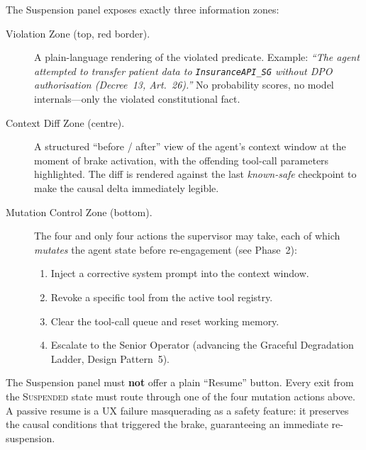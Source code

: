 The Suspension panel exposes exactly three information zones:

\begin{description}
  \item[Violation Zone (top, red border).]
        A plain-language rendering of the violated predicate.  Example:
        \textit{``The agent attempted to transfer patient data to
        \texttt{InsuranceAPI\_SG} without DPO authorisation
        (Decree~13, Art.~26).''}
        No probability scores, no model internals—only the
        violated constitutional fact.

  \item[Context Diff Zone (centre).]
        A structured ``before / after'' view of the agent's context
        window at the moment of brake activation, with the offending
        tool-call parameters highlighted.  The diff is rendered against
        the last \emph{known-safe} checkpoint to make the causal delta
        immediately legible.

  \item[Mutation Control Zone (bottom).]
        The four and only four actions the supervisor may take, each of
        which \emph{mutates} the agent state before re-engagement
        (see Phase~2):
        \begin{enumerate}
          \item Inject a corrective system prompt into the context window.
          \item Revoke a specific tool from the active tool registry.
          \item Clear the tool-call queue and reset working memory.
          \item Escalate to the Senior Operator (advancing the
                Graceful Degradation Ladder, Design Pattern~5).
        \end{enumerate}
\end{description}

\begin{tcolorbox}[
  colback=gray!8, colframe=black!60,
  title={\textbf{Design Principle: No Passive Resume}},
  fonttitle=\bfseries, boxrule=0.4pt]
The Suspension panel must \textbf{not} offer a plain ``Resume'' button.
Every exit from the \textsc{Suspended} state must route through one of
the four mutation actions above.  A passive resume is a UX failure
masquerading as a safety feature: it preserves the causal conditions
that triggered the brake, guaranteeing an immediate re-suspension.
\end{tcolorbox}

